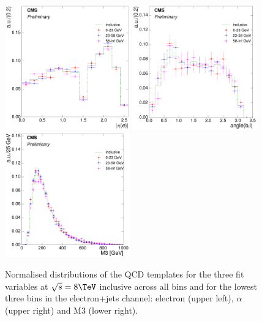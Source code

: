 \begin{figure}[hbtp]
    \centering
     \includegraphics[width=0.48\textwidth]{Chapters/04_Analysis/04b_XSections/images/8TeV/fit_variables/electron/MT/electron_absolute_eta/qcd/MT_electron_absolute_eta_0orMoreBtag_QCD_template_comparison.pdf}\hfill
     \includegraphics[width=0.48\textwidth]{Chapters/04_Analysis/04b_XSections/images/8TeV/fit_variables/electron/MT/angle_bl/qcd/MT_angle_bl_1orMoreBtag_QCD_template_comparison.pdf}\\
     \includegraphics[width=0.48\textwidth]{Chapters/04_Analysis/04b_XSections/images/8TeV/fit_variables/electron/MT/M3/qcd/MT_M3_0orMoreBtag_QCD_template_comparison.pdf}\\
	 \caption{Normalised distributions of the QCD templates for the three fit variables at $\sqrt{s}=8\TeV$
	 inclusive across all \mt bins and for the lowest three \mt bins in the electron+jets channel: electron
	 \abseta (upper left), $\alpha$ (upper right) and M3 (lower right).}
     \label{fig:MT_fit_variable_qcd_comparisons_electron_8TeV}
\end{figure}


